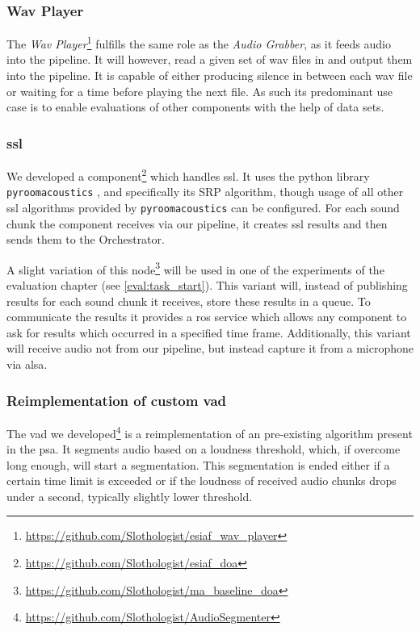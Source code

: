 \subsubsection{Wav Player}
\label{main:components:wav}
The \textit{Wav Player}\footnote{\url{https://github.com/Slothologist/esiaf_wav_player}} fulfills the same role as the \textit{Audio Grabber}, as it feeds audio into the pipeline.
It will however, read a given set of wav files in and output them into the pipeline.
It is capable of either producing silence in between each wav file or waiting for a time before playing the next file.
As such its predominant use case is to enable evaluations of other components with the help of data sets.

\subsubsection{\gls{ssl}}
\label{main:components:ssl}
We developed a component\footnote{\url{https://github.com/Slothologist/esiaf_doa}} which handles \gls{ssl}.
It uses the python library \texttt{pyroomacoustics} \cite{pyroomacoustics}, and specifically its SRP algorithm, though usage of all other \gls{ssl} algorithms provided by \texttt{pyroomacoustics} can be configured.
For each sound chunk the component receives via our pipeline, it creates \gls{ssl} results and then sends them to the Orchestrator.

A slight variation of this node\footnote{\url{https://github.com/Slothologist/ma_baseline_doa}}  will be used in one of the experiments of the evaluation chapter (see \ref{eval:task_start}).
This variant will, instead of publishing results for each sound chunk it receives, store these results in a queue.
To communicate the results it provides a \gls{ros} service which allows any component to ask for results which occurred in a specified time frame.
Additionally, this variant will receive audio not from our pipeline, but instead capture it from a microphone via \gls{alsa}.

\subsubsection{Reimplementation of custom \gls{vad}}
\label{main:components:vad}
The \gls{vad} we developed\footnote{\url{https://github.com/Slothologist/AudioSegmenter}} is a reimplementation of an pre-existing algorithm present in the \gls{psa}.
It segments audio based on a loudness threshold, which, if overcome long enough, will start a segmentation.
This segmentation is ended either if a certain time limit is exceeded or if the loudness of received audio chunks drops under a second, typically slightly lower threshold.

